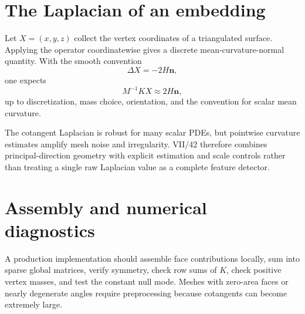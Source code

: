 \section{The Laplacian of an embedding}

Let \(X=(x,y,z)\) collect the vertex coordinates of a triangulated surface.
Applying the operator coordinatewise gives a discrete mean-curvature-normal
quantity.  With the smooth convention
\[
\Delta X=-2H\mathbf n,
\]
one expects
\[
M^{-1}KX\approx 2H\mathbf n,
\]
up to discretization, mass choice, orientation, and the convention for scalar
mean curvature.

\begin{remark}\label{rem:vii41-curvature}
The cotangent Laplacian is robust for many scalar PDEs, but pointwise curvature
estimates amplify mesh noise and irregularity.  VII/42 therefore combines
principal-direction geometry with explicit estimation and scale controls rather
than treating a single raw Laplacian value as a complete feature detector.
\end{remark}

\section{Assembly and numerical diagnostics}

A production implementation should assemble face contributions locally, sum
into sparse global matrices, verify symmetry, check row sums of \(K\), check
positive vertex masses, and test the constant null mode.  Meshes with zero-area
faces or nearly degenerate angles require preprocessing because cotangents can
become extremely large.

